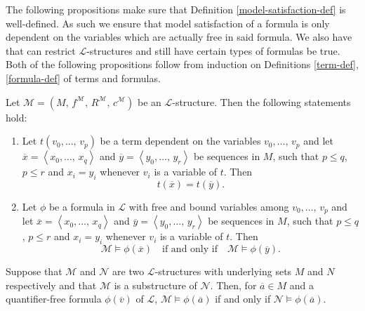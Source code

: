 \documentclass[../../main.tex]{subfiles}
\begin{document}
The following propositions make sure that Definition \ref{model-satisfaction-def} is well-defined.
As such we ensure that model satisfaction of a formula is only dependent on the variables which are actually free in said formula.
We also have that can restrict $\mathcal{L}$-structures and still have certain types of formulas be true.
Both of the following propositions follow from induction on Definitions \ref{term-def}, \ref{formula-def} of terms and formulas.

\begin{proposition}\cite[Proposition 1.3.16]{Cha90}
    Let $\mathcal{M} = \left(M,\, f^{\mathcal{M}},\, R^{\mathcal{M}},\, c^{\mathcal{M}}\right)$ be an $\mathcal{L}$-structure.
    Then the following statements hold:
    \begin{enumerate}
        \item Let $t(v_0,\ldots,\, v_p)$ be a term dependent on the variables $v_0,\ldots,\, v_p$ and let $\overline{x} = \left<x_0,\ldots,\, x_q\right>$ and $\overline{y} = \left<y_0,\ldots,\, y_r\right>$ be sequences in $M$,
        such that $p \leq q$, $p \leq r$ and $x_i = y_i$ whenever $v_i$ is a variable of $t$.
        Then $$t(\overline{x}) = t(\overline{y}).$$
        \item Let $\phi$ be a formula in $\mathcal{L}$ with free and bound variables among $v_0,\ldots,\, v_p$ and let $\overline{x} = \left<x_0,\ldots,\, x_q\right>$ and $\overline{y} = \left<y_0,\ldots,\, y_r\right>$ be sequences in $M$,
        such that $p \leq q$, $p \leq r$ and $x_i = y_i$ whenever $v_i$ is a variable of $t$.
        Then $$\mathcal{M} \models \phi(\overline{x}) \quad \text{if and only if} \quad \mathcal{M} \models \phi(\overline{y}).$$
    \end{enumerate}
\end{proposition}

\begin{proposition}\cite[Proposition 1.1.8]{Mar02}
        Suppose that $\mathcal{M}$ and $\mathcal{N}$ are two $\mathcal{L}$-structures with underlying sets $M$ and $N$ respectively and that $\mathcal{M}$ is a substructure of $\mathcal{N}$.
        Then, for $\overline{a} \in M$ and a quantifier-free formula $\phi(\overline{v})$ of $\mathcal{L}$,
        $\mathcal{M} \models \phi(\overline{a})$ if and only if $\mathcal{N} \models \phi(\overline{a})$.
\end{proposition}

% 
% 
%
\end{document}
